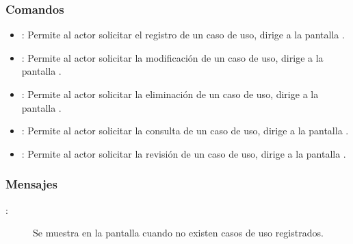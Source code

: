 

\subsubsection{Comandos}
\begin{itemize}
	\item {}: Permite al actor solicitar el registro de un caso de uso, dirige a la pantalla .
	\item \btnEditar[Modificar]: Permite al actor solicitar la modificación de un caso de uso, dirige a la pantalla .
	\item \btnEliminar[Eliminar]: Permite al actor solicitar la eliminación de un caso de uso, dirige a la pantalla .
	\item \btnConsulta[Consultar]: Permite al actor solicitar la consulta de un caso de uso, dirige a la pantalla .
	\item \btnRevisar[Revisar]: Permite al actor solicitar la revisión de un caso de uso, dirige a la pantalla .
\end{itemize}

\subsubsection{Mensajes}

	
\begin{description}
	\item[:] Se muestra en la pantalla  cuando no existen casos de uso registrados.
\end{description}
